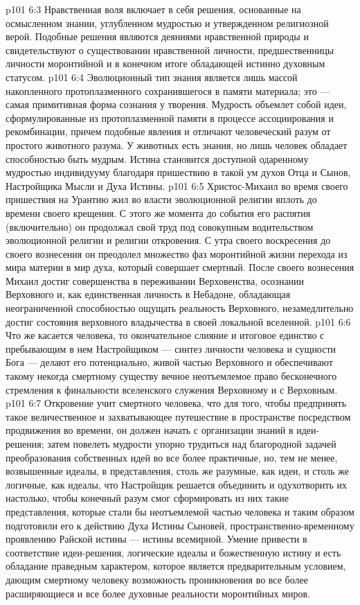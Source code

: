 \vs p101 6:3 \pc Нравственная воля включает в себя решения, основанные на осмысленном знании, углубленном мудростью и утвержденном религиозной верой. Подобные решения являются деяниями нравственной природы и свидетельствуют о существовании нравственной личности, предшественницы личности моронтийной и в конечном итоге обладающей истинно духовным статусом.
\vs p101 6:4 Эволюционный тип знания является лишь массой накопленного протоплазменного сохранившегося в памяти материала; это --- самая примитивная форма сознания у творения. Мудрость объемлет собой идеи, сформулированные из протоплазменной памяти в процессе ассоциирования и рекомбинации, причем подобные явления и отличают человеческий разум от простого животного разума. У животных есть знания, но лишь человек обладает способностью быть мудрым. Истина становится доступной одаренному мудростью индивидууму благодаря пришествию в такой ум духов Отца и Сынов, Настройщика Мысли и Духа Истины.
\vs p101 6:5 \pc Христос\hyp{}Михаил во время своего пришествия на Урантию жил во власти эволюционной религии вплоть до времени своего крещения. С этого же момента до события его распятия (включительно) он продолжал свой труд под совокупным водительством эволюционной религии и религии откровения. С утра своего воскресения до своего вознесения он преодолел множество фаз моронтийной жизни перехода из мира материи в мир духа, который совершает смертный. После своего вознесения Михаил достиг совершенства в переживании Верховенства, осознании Верховного и, как единственная личность в Небадоне, обладающая неограниченной способностью ощущать реальность Верховного, незамедлительно достиг состояния верховного владычества в своей локальной вселенной.
\vs p101 6:6 Что же касается человека, то окончательное слияние и итоговое единство с пребывающим в нем Настройщиком --- синтез личности человека и сущности Бога --- делают его потенциально, живой частью Верховного и обеспечивают такому некогда смертному существу вечное неотъемлемое право бесконечного стремления к финальности вселенского служения Верховному и с Верховным.
\vs p101 6:7 \pc Откровение учит смертного человека, что для того, чтобы предпринять такое величественное и захватывающее путешествие в пространстве посредством продвижения во времени, он должен начать с организации знаний в идеи\hyp{}решения; затем повелеть мудрости упорно трудиться над благородной задачей преобразования собственных идей во все более практичные, но, тем не менее, возвышенные идеалы, в представления, столь же разумные, как идеи, и столь же логичные, как идеалы, что Настройщик решается объединить и одухотворить их настолько, чтобы конечный разум смог сформировать из них такие представления, которые стали бы неотъемлемой частью человека и таким образом подготовили его к действию Духа Истины Сыновей, пространственно\hyp{}временному проявлению Райской истины --- истины всемирной. Умение привести в соответствие идеи\hyp{}решения, логические идеалы и божественную истину и есть обладание праведным характером, которое является предварительным условием, дающим смертному человеку возможность проникновения во все более расширяющиеся и все более духовные реальности моронтийных миров.
